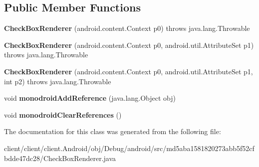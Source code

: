 \subsection*{Public Member Functions}
\begin{DoxyCompactItemize}
\item 
\hypertarget{classmd5aba1581820273abb5f52cfbdde47dc28_1_1CheckBoxRenderer_aff5c34c95893b088ffe970fe7ca04ea7}{}{\bfseries Check\+Box\+Renderer} (android.\+content.\+Context p0)  throws java.\+lang.\+Throwable 	\label{classmd5aba1581820273abb5f52cfbdde47dc28_1_1CheckBoxRenderer_aff5c34c95893b088ffe970fe7ca04ea7}

\item 
\hypertarget{classmd5aba1581820273abb5f52cfbdde47dc28_1_1CheckBoxRenderer_a46f8b23881da9de19b958787f160b916}{}{\bfseries Check\+Box\+Renderer} (android.\+content.\+Context p0, android.\+util.\+Attribute\+Set p1)  throws java.\+lang.\+Throwable 	\label{classmd5aba1581820273abb5f52cfbdde47dc28_1_1CheckBoxRenderer_a46f8b23881da9de19b958787f160b916}

\item 
\hypertarget{classmd5aba1581820273abb5f52cfbdde47dc28_1_1CheckBoxRenderer_a3d24356054264716d16de514181491b2}{}{\bfseries Check\+Box\+Renderer} (android.\+content.\+Context p0, android.\+util.\+Attribute\+Set p1, int p2)  throws java.\+lang.\+Throwable 	\label{classmd5aba1581820273abb5f52cfbdde47dc28_1_1CheckBoxRenderer_a3d24356054264716d16de514181491b2}

\item 
\hypertarget{classmd5aba1581820273abb5f52cfbdde47dc28_1_1CheckBoxRenderer_a752b0e717360eb92103c702dbed6894d}{}void {\bfseries monodroid\+Add\+Reference} (java.\+lang.\+Object obj)\label{classmd5aba1581820273abb5f52cfbdde47dc28_1_1CheckBoxRenderer_a752b0e717360eb92103c702dbed6894d}

\item 
\hypertarget{classmd5aba1581820273abb5f52cfbdde47dc28_1_1CheckBoxRenderer_a07ec00ad0e87b80a8abf31655826b333}{}void {\bfseries monodroid\+Clear\+References} ()\label{classmd5aba1581820273abb5f52cfbdde47dc28_1_1CheckBoxRenderer_a07ec00ad0e87b80a8abf31655826b333}

\end{DoxyCompactItemize}


The documentation for this class was generated from the following file\+:\begin{DoxyCompactItemize}
\item 
client/client/client.\+Android/obj/\+Debug/android/src/md5aba1581820273abb5f52cfbdde47dc28/Check\+Box\+Renderer.\+java\end{DoxyCompactItemize}
